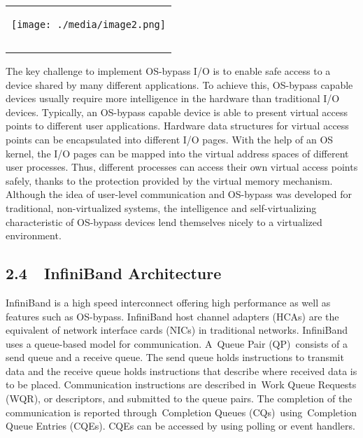 \documentclass[12pt]{article}
\begin{document}


\begin{table}[H]
 			\centering
\begin{tabular}{p{3.88in}}
\multicolumn{1}{p{3.88in}}{
	\begin{Center}
		\texttt{[image: ./media/image2.png]}
	\end{Center}
} \\
\hhline{~}
\multicolumn{1}{p{3.88in}}{\Centering \textbf{Figure 2:} OS-Bypass Communication and I/O} \\
\hhline{~}

\end{tabular}
 \end{table}



\setlength{\parskip}{8.04pt}
{\fontsize{13pt}{15.6pt}\selectfont The key challenge to implement OS-bypass I/O is to enable safe access to a device shared by many different applications. To achieve this, OS-bypass capable devices usually require more intelligence in the hardware than traditional I/O devices. Typically, an OS-bypass capable device is able to present virtual access points to different user applications. Hardware data structures for virtual access points can be encapsulated into different I/O pages. With the help of an OS kernel, the I/O pages can be mapped into the virtual address spaces of different user processes. Thus, different processes can access their own virtual access points safely, thanks to the protection provided by the virtual memory mechanism. Although the idea of user-level communication and OS-bypass was developed for traditional, non-virtualized systems, the intelligence and self-virtualizing characteristic of OS-bypass devices lend themselves nicely to a virtualized environment.\par}\par


\vspace{\baselineskip}
\subsection*{2.4\ \  InfiniBand Architecture}
{\fontsize{13pt}{15.6pt}\selectfont InfiniBand is a high speed interconnect offering high performance as well as features such as OS-bypass. InfiniBand host channel adapters (HCAs) are the equivalent of network interface cards (NICs) in traditional networks. InfiniBand uses a queue-based model for communication. A Queue Pair (QP) consists of a send queue and a receive queue. The send queue holds instructions to transmit data and the receive queue holds instructions that describe where received data is to be placed. Communication instructions are described in Work Queue Requests (WQR), or descriptors, and submitted to the queue pairs. The completion of the communication is reported through Completion Queues (CQs) using Completion Queue Entries (CQEs). CQEs can be accessed by using polling or event handlers.\par}\par
\end{document}
